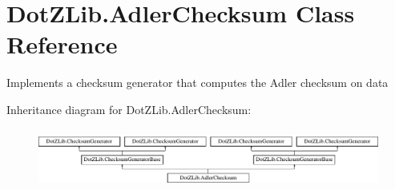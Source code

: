 \hypertarget{class_dot_z_lib_1_1_adler_checksum}{}\section{Dot\+Z\+Lib.\+Adler\+Checksum Class Reference}
\label{class_dot_z_lib_1_1_adler_checksum}


Implements a checksum generator that computes the Adler checksum on data  


Inheritance diagram for Dot\+Z\+Lib.\+Adler\+Checksum\+:\begin{figure}[H]
\begin{center}
\leavevmode
\includegraphics[height=1.981132cm]{class_dot_z_lib_1_1_adler_checksum}
\end{center}
\end{figure}
